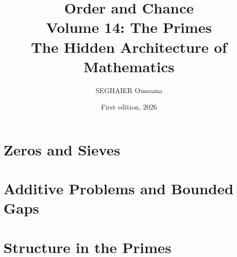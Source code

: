 \documentclass[11pt,openany]{book}
\title{\Huge\textbf{Order and Chance}\\[0.4em]\LARGE Volume 14: The Primes\\[0.6em]
\Large The Hidden Architecture of Mathematics}
\author{SEGHAIER Oussama}
\date{First edition, 2026}
\begin{document}
\frontmatter
\makecover
\maketitle

\tableofcontents

\mainmatter

\part{Zeros and Sieves}





\part{Additive Problems and Bounded Gaps}




\part{Structure in the Primes}







\end{document}
